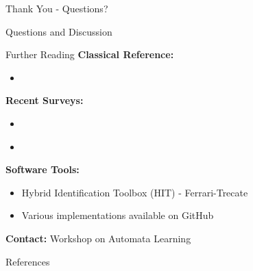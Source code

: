 \documentclass[aspectratio=169]{beamer}
\begin{document}
\begin{frame}{Thank You - Questions?}
\begin{center}
\Large{Questions and Discussion}
\end{center}

\vspace{1cm}

\begin{block}{Further Reading}
\textbf{Classical Reference:}
\begin{itemize}
\item \cite{paoletti2007identification}
\end{itemize}

\textbf{Recent Surveys:}
\begin{itemize}
\item \cite{lauer2023models}
\item \cite{chen2024deep}
\end{itemize}

\textbf{Software Tools:}
\begin{itemize}
\item Hybrid Identification Toolbox (HIT) - Ferrari-Trecate
\item Various implementations available on GitHub
\end{itemize}
\end{block}

\begin{center}
\textbf{Contact:} Workshop on Automata Learning
\end{center}
\end{frame}

\begin{frame}[allowframebreaks]{References}
\printbibliography
\end{frame}
\end{document}
